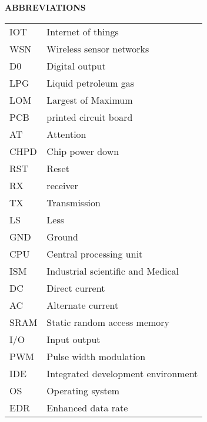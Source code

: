 \begin{center}
{\large\bf ABBREVIATIONS}
\end{center}
\begin{table}[h!]
\begin{tabular}{p{2cm}p{8cm}}
IOT & Internet of things\\
WSN &  Wireless sensor networks\\
D0 & Digital output  \\
LPG & Liquid petroleum gas \\
LOM & Largest of Maximum \\
PCB & printed circuit board \\
AT & Attention \\
CHPD & Chip power down \\
RST &  Reset\\
RX & receiver  \\
TX & Transmission  \\
LS & Less \\
GND & Ground \\
CPU & Central processing unit \\
ISM & Industrial scientific and Medical \\
DC  & Direct current \\
AC & Alternate current \\
SRAM & Static random access memory\\
I/O & Input output \\
PWM  & Pulse width modulation \\
IDE & Integrated development environment\\
OS  & Operating system \\
EDR  & Enhanced data rate 
\end{tabular}
\end{table}
